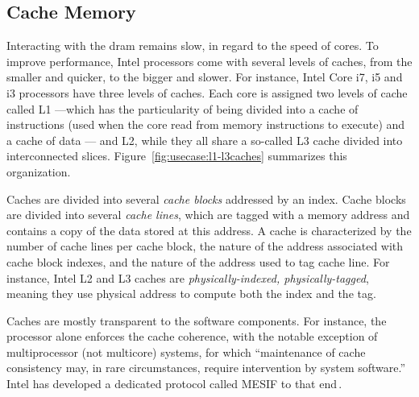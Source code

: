 \subsection{Cache Memory}
\label{subsec:usecase:cachemem}
%
Interacting with the \ac{dram} remains slow, in regard to the speed of cores.
%
To improve performance, Intel processors come with several levels of caches,
from the smaller and quicker, to the bigger and slower.
%
For instance, Intel Core i7, i5 and i3 processors have three levels of caches.
%
Each core is assigned two levels of cache called L1 ---which has the
particularity of being divided into a cache of instructions (used when the core
read from memory instructions to execute) and a cache of data --- and L2, while
they all share a so-called L3 cache divided into interconnected slices.
%
Figure~\ref{fig:usecase:l1-l3caches} summarizes this organization.

Caches are divided into several \emph{cache blocks} addressed by an index.
%
Cache blocks are divided into several \emph{cache lines}, which are tagged with
a memory address and contains a copy of the data stored at this address.
%
A cache is characterized by the number of cache lines per cache block, the
nature of the address associated with cache block indexes, and the nature of the
address used to tag cache line.
%
For instance, Intel L2 and L3 caches are \emph{physically-indexed,
  physically-tagged}, meaning they use physical address to compute both the
index and the tag.

Caches are mostly transparent to the software components.
%
For instance, the processor alone enforces the cache coherence, with the notable
exception of multiprocessor (not multicore) systems, for which ``maintenance of
cache consistency may, in rare circumstances, require intervention by system
software.''
%
Intel has developed a dedicated protocol called MESIF to that
end\,\cite{thomadakis2011nehalem}.

